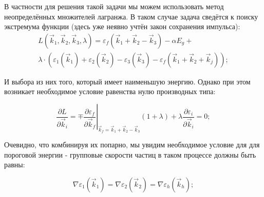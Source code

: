 \documentclass[../main.tex]{subfiles}
\begin{document}

    
    В частности для решения такой задачи мы можем использовать метод 
    неопределённых множителей лагранжа. В таком случае задача сведётся
    к поиску экстремума функции (здесь уже неявно учтён 
    закон сохранения импульса):
    \begin{multline}
        L (\vec{k}_1,\vec{k}_2,\vec{k}_3, \lambda) = \varepsilon_f(\vec{k}_1 + \vec{k}_2 - \vec{k}_3) - \alpha E_g + \\
            \lambda \cdot \left(\varepsilon_1(\vec{k}_1) + 
            \varepsilon_2(\vec{k}_2) - \varepsilon_3(\vec{k}_3) - \varepsilon_f(\vec{k}_1 + \vec{k}_2 + \vec{k}_j)\right);
    \end{multline}

    И выбора из них того, который имеет наименьшую энергию. Однако при этом возникает
    необходимое условие равенства нулю производных типа:

    \begin{equation*}
        \frac{\partial L}{\partial \vec{k}_i} = 
            \mp \left. \frac{\partial \varepsilon_f}{\partial \vec{k}_f}\right\rvert_{\vec{k}_f = \vec{k}_1 + \vec{k}_2 - \vec{k}_3} 
            (1 + \lambda)  + \lambda \frac{\partial \varepsilon_i}{\partial \vec{k}_i} = 0;
    \end{equation*}

    Очевидно, что комбинируя их попарно, мы увидим необходимое условие для для пороговой
    энергии - групповые скорости частиц в таком процессе должны быть равны:

    \begin{equation}
        \nabla \varepsilon_1(\vec{k}_1) = \nabla \varepsilon_2(\vec{k}_2) = \nabla \varepsilon_h(\vec{k}_h);
    \end{equation}

    
\end{document}
